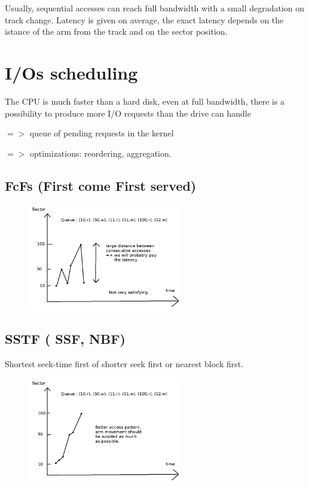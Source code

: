 Usually, sequential accesses can reach full bandwidth with a small degradation on track change.
Latency is given on average, the exact latency depends on the istance of the arm from the track and on the sector position.

\section{I/Os scheduling}

The CPU is much faster than a hard disk, even at full bandwidth, there is a possibility to produce more I/O requests than the drive can handle

$=>$ queue of pending requests in the kernel

$=>$ optimizations: reordering, aggregation.

\subsection{FcFs (First come First served)}

\begin{figure}[h!]
  \begin{center}
    \includegraphics[width=0.6\textwidth]{fcfs.png}
  \end{center}
\end{figure}

\subsection{SSTF ( SSF, NBF)}

Shortest seek-time first of shorter seek first or nearest block first.

\begin{figure}[th!]
  \begin{center}
    \includegraphics[width=0.6\textwidth]{sstf.png}
  \end{center}
\end{figure}

